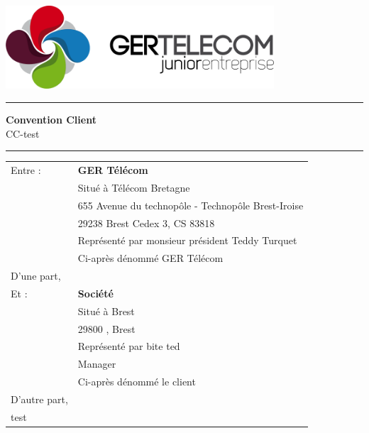 \documentclass[10pt,a4paper]{article}
\renewcommand{\headrulewidth}{0pt}
\begin{document}
\centering
\includegraphics[width=10cm]{GER.png}\\
\rule{\linewidth}{.5pt}
\Huge \textbf{\textsf{Convention Client}}\\
\vspace{0.2cm}
\huge \textsf{CC-test}
\rule{\linewidth}{.5pt}
\normalsize
\flushleft
\vspace{1cm}
\begin{tabular}{ll}
Entre : 	&\textbf{GER Télécom}\\
&Situé à Télécom Bretagne \\
&655 Avenue du technopôle - Technopôle Brest-Iroise \\
&29238 Brest Cedex 3, CS 83818\\
&Représenté par monsieur président Teddy Turquet\\
\vspace{0.5cm}&Ci-après dénommé GER Télécom\\
\vspace{1cm}D'une part,\\
Et :		&\textbf{Société}\\
&Situé à Brest\\
&29800 , Brest\\
&Représenté par bite ted\\
&Manager\\
\vspace{0.5cm}&Ci-après dénommé le client\\
D'autre part,\\
test
\end{tabular}
\newpage
\renewcommand{\headrulewidth}{0pt}

\lipsum[1]
\lipsum[1]
\lipsum[1]
\lipsum[1]
\lipsum[1]
\lipsum[1]
\lipsum[1]
\lipsum[1]
\lipsum[1]
\lipsum[1]
\lipsum[1]
\lipsum[1]
\lipsum[1]
\lipsum[1]
\lipsum[1]
\lipsum[1]
\lipsum[1]
\lipsum[1]
\end{document}
